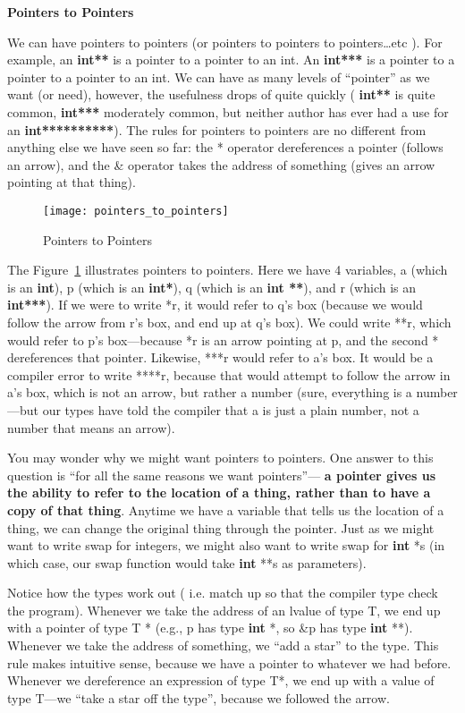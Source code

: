 \documentclass[11pt, a4paper]{article}
\begin{document}
\textbf{Pointers to Pointers}

We can have pointers to pointers (or pointers to pointers to pointers…etc ). For example, an \textbf{int**} is a pointer to a pointer to an int. An \textbf{int***} is a pointer to a pointer to a pointer to an int. We can have as many levels of “pointer” as we want (or need), however, the usefulness drops of quite quickly ( \textbf{int**} is quite common, \textbf{int***} moderately common, but neither author has ever had a use for an \textbf{int**********}). The rules for pointers to pointers are no different from anything else we have seen so far: the * operator dereferences a pointer (follows an arrow), and the \& operator takes the address of something (gives an arrow pointing at that thing).


\begin{figure}[htpb]
  \centering
  \texttt{[image: pointers\_to\_pointers]}
  \caption{Pointers to Pointers}
  \label{fig:pointers_to_pointers}
\end{figure}




The Figure~\ref{fig:pointers_to_pointers} illustrates pointers to pointers. Here we have 4 variables, a (which is an \textbf{int}), p (which is an \textbf{int*}), q (which is an \textbf{int **}), and r (which is an \textbf{int***}). If we were to write *r, it would refer to q’s box (because we would follow the arrow from r’s box, and end up at q’s box). We could write **r, which would refer to p’s box—because *r is an arrow pointing at p, and the second * dereferences that pointer. Likewise, ***r would refer to a’s box. It would be a compiler error to write ****r, because that would attempt to follow the arrow in a’s box, which is not an arrow, but rather a number (sure, everything is a number—but our types have told the compiler that a is just a plain number, not a number that means an arrow).

You may wonder why we might want pointers to pointers. One answer to this question is “for all the same reasons we want pointers”— \textbf{a pointer gives us the ability to refer to the location of a thing, rather than to have a copy of that thing}. Anytime we have a variable that tells us the location of a thing, we can change the original thing through the pointer. Just as we might want to write swap for integers, we might also want to write swap for \textbf{int} *s (in which case, our swap function would take \textbf{int} **s as parameters).

Notice how the types work out ( i.e. match up so that the compiler type check the program). Whenever we take the address of an lvalue of type T, we end up with a pointer of type T * (e.g., p has type \textbf{int} *, so \&p has type \textbf{int} **). Whenever we take the address of something, we “add a star” to the type. This rule makes intuitive sense, because we have a pointer to whatever we had before. Whenever we dereference an expression of type T*, we end up with a value of type T—we “take a star off the type”, because we followed the arrow.
\end{document}
